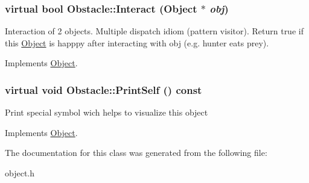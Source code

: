 \hypertarget{classObstacle_a53bec243dc8a00f23ec61c915aef4c3e}{
\subsubsection[{Interact}]{\setlength{\rightskip}{0pt plus 5cm}virtual bool Obstacle::Interact ({\bf Object} $\ast$ {\em obj})}}
\label{classObstacle_a53bec243dc8a00f23ec61c915aef4c3e}
Interaction of 2 objects. Multiple dispatch idiom (pattern visitor). Return true if this \hyperlink{classObject}{Object} is happpy after interacting with obj (e.g. hunter eats prey). 

Implements \hyperlink{classObject_a27d03e80827229de2ce885a0bc1c83c0}{Object}.

\hypertarget{classObstacle_ad4355e9d1db002f6db2ca15ae5605d05}{
\subsubsection[{PrintSelf}]{\setlength{\rightskip}{0pt plus 5cm}virtual void Obstacle::PrintSelf () const}}
\label{classObstacle_ad4355e9d1db002f6db2ca15ae5605d05}
Print special symbol wich helps to visualize this object 

Implements \hyperlink{classObject_a2c63e79dfa8626451b4a04b0b72294eb}{Object}.



The documentation for this class was generated from the following file:\begin{DoxyCompactItemize}
\item 
object.h\end{DoxyCompactItemize}
